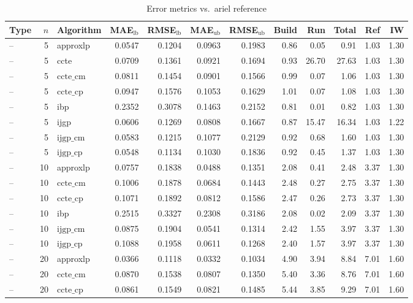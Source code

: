 \begin{table}[ht]
\centering
\scriptsize
\caption{Error metrics vs.\ ariel reference}
\begin{tabular}{lrlrrrrrrrrr}
\toprule
Type & $n$ & Algorithm & MAE$_{\text{lb}}$ & RMSE$_{\text{lb}}$ & MAE$_{\text{ub}}$ & RMSE$_{\text{ub}}$ & Build & Run & Total & Ref & IW \\
\midrule
-- & 5 & approxlp & 0.0547 & 0.1204 & 0.0963 & 0.1983 & 0.86 & 0.05 & 0.91 & 1.03 & 1.30 \\
-- & 5 & ccte & 0.0709 & 0.1361 & 0.0921 & 0.1694 & 0.93 & 26.70 & 27.63 & 1.03 & 1.30 \\
-- & 5 & $\text{ccte\_cm}$ & 0.0811 & 0.1454 & 0.0901 & 0.1566 & 0.99 & 0.07 & 1.06 & 1.03 & 1.30 \\
-- & 5 & $\text{ccte\_cp}$ & 0.0947 & 0.1576 & 0.1053 & 0.1629 & 1.01 & 0.07 & 1.08 & 1.03 & 1.30 \\
-- & 5 & ibp & 0.2352 & 0.3078 & 0.1463 & 0.2152 & 0.81 & 0.01 & 0.82 & 1.03 & 1.30 \\
-- & 5 & ijgp & 0.0606 & 0.1269 & 0.0808 & 0.1667 & 0.87 & 15.47 & 16.34 & 1.03 & 1.22 \\
-- & 5 & $\text{ijgp\_cm}$ & 0.0583 & 0.1215 & 0.1077 & 0.2129 & 0.92 & 0.68 & 1.60 & 1.03 & 1.30 \\
-- & 5 & $\text{ijgp\_cp}$ & 0.0548 & 0.1134 & 0.1030 & 0.1836 & 0.92 & 0.45 & 1.37 & 1.03 & 1.30 \\
-- & 10 & approxlp & 0.0757 & 0.1838 & 0.0488 & 0.1351 & 2.08 & 0.41 & 2.48 & 3.37 & 1.30 \\
-- & 10 & $\text{ccte\_cm}$ & 0.1006 & 0.1878 & 0.0684 & 0.1443 & 2.48 & 0.27 & 2.75 & 3.37 & 1.30 \\
-- & 10 & $\text{ccte\_cp}$ & 0.1071 & 0.1892 & 0.0812 & 0.1586 & 2.47 & 0.26 & 2.73 & 3.37 & 1.30 \\
-- & 10 & ibp & 0.2515 & 0.3327 & 0.2308 & 0.3186 & 2.08 & 0.02 & 2.09 & 3.37 & 1.30 \\
-- & 10 & $\text{ijgp\_cm}$ & 0.0875 & 0.1904 & 0.0541 & 0.1314 & 2.42 & 1.55 & 3.97 & 3.37 & 1.30 \\
-- & 10 & $\text{ijgp\_cp}$ & 0.1088 & 0.1958 & 0.0611 & 0.1268 & 2.40 & 1.57 & 3.97 & 3.37 & 1.30 \\
-- & 20 & approxlp & 0.0366 & 0.1118 & 0.0332 & 0.1034 & 4.90 & 3.94 & 8.84 & 7.01 & 1.60 \\
-- & 20 & $\text{ccte\_cm}$ & 0.0870 & 0.1538 & 0.0807 & 0.1350 & 5.40 & 3.36 & 8.76 & 7.01 & 1.60 \\
-- & 20 & $\text{ccte\_cp}$ & 0.0861 & 0.1549 & 0.0821 & 0.1485 & 5.44 & 3.85 & 9.29 & 7.01 & 1.60 \\

\end{tabular}
\end{table}
